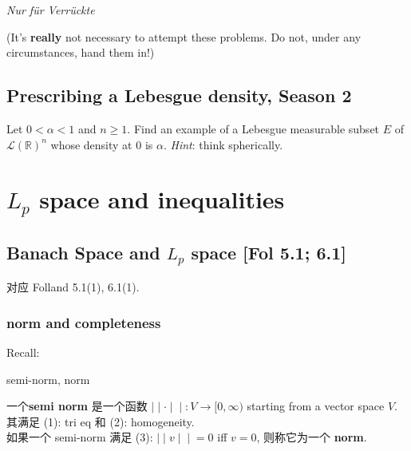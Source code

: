 \documentclass{qlnotes-export}
\begin{document}
\emph{Nur für Verrückte}

(It's \textbf{really} not necessary to attempt these problems. Do not, under any circumstances, hand them in!)

\section{Prescribing a Lebesgue density, Season 2}\label{prescribing-a-lebesgue-density-season-2}

Let \(0 < \alpha < 1\) and \(n \geq 1\). Find an example of a Lebesgue measurable subset \(E\) of \(\mathcal{L}({\mathbb{R}})^{n}\) whose density at \(0\) is \(\alpha\). \emph{Hint}: think spherically.

\chapter{\texorpdfstring{\(L_{p}\) space and inequalities}{L\_\{p\} space and inequalities}}\label{l_p-space-and-inequalities}

\section{\texorpdfstring{Banach Space and \(L_{p}\) space {[}Fol 5.1; 6.1{]}}{Banach Space and L\_\{p\} space {[}Fol 5.1; 6.1{]}}}

对应 Folland 5.1(1), 6.1(1).

\subsection{norm and completeness}\label{norm-and-completeness}

Recall:

\begin{definition}{semi-norm, norm}\label{def-09-l-p-space-and-inequalities-semi-norm-norm}

一个\textbf{semi norm} 是一个函数 \(\left. | \middle| \cdot \middle| \middle| :V\rightarrow\lbrack 0,\infty) \right.\) starting from a vector space \(V\). 其满足 (1): tri eq 和 (2): homogeneity.\\
如果一个 semi-norm 满足 (3): \(\left. | \middle| v \middle| \middle| = 0 \right.\) iff \(v = 0\), 则称它为一个 \textbf{norm}.

\end{definition}
\end{document}

